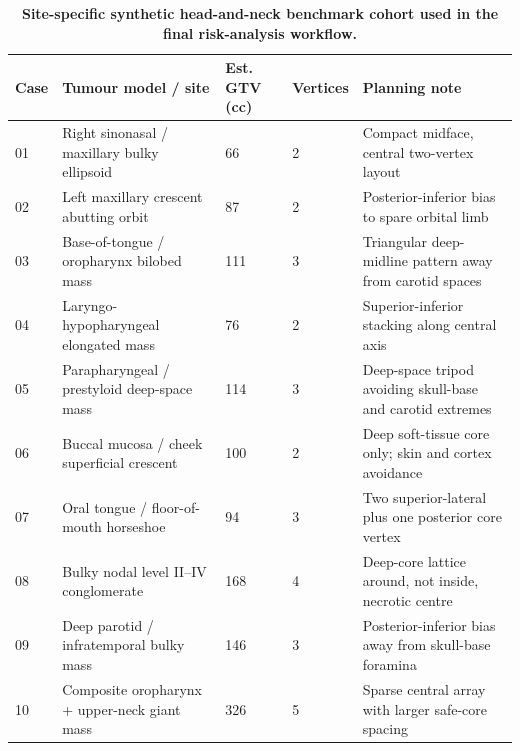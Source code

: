 \begin{table}[H]
\centering
\caption{\textbf{Site-specific synthetic head-and-neck benchmark cohort used in the final risk-analysis workflow.}}
\label{tab:case_library}
\small
\begin{tabular}{p{1.2cm}p{5.0cm}p{1.7cm}p{1.5cm}p{3.2cm}}
\toprule
Case & Tumour model / site & Est. GTV (cc) & Vertices & Planning note \\
\midrule
01 & Right sinonasal / maxillary bulky ellipsoid & 66 & 2 & Compact midface, central two-vertex layout \\
02 & Left maxillary crescent abutting orbit & 87 & 2 & Posterior-inferior bias to spare orbital limb \\
03 & Base-of-tongue / oropharynx bilobed mass & 111 & 3 & Triangular deep-midline pattern away from carotid spaces \\
04 & Laryngo-hypopharyngeal elongated mass & 76 & 2 & Superior-inferior stacking along central axis \\
05 & Parapharyngeal / prestyloid deep-space mass & 114 & 3 & Deep-space tripod avoiding skull-base and carotid extremes \\
06 & Buccal mucosa / cheek superficial crescent & 100 & 2 & Deep soft-tissue core only; skin and cortex avoidance \\
07 & Oral tongue / floor-of-mouth horseshoe & 94 & 3 & Two superior-lateral plus one posterior core vertex \\
08 & Bulky nodal level II--IV conglomerate & 168 & 4 & Deep-core lattice around, not inside, necrotic centre \\
09 & Deep parotid / infratemporal bulky mass & 146 & 3 & Posterior-inferior bias away from skull-base foramina \\
10 & Composite oropharynx + upper-neck giant mass & 326 & 5 & Sparse central array with larger safe-core spacing \\
\bottomrule
\end{tabular}
\end{table}
